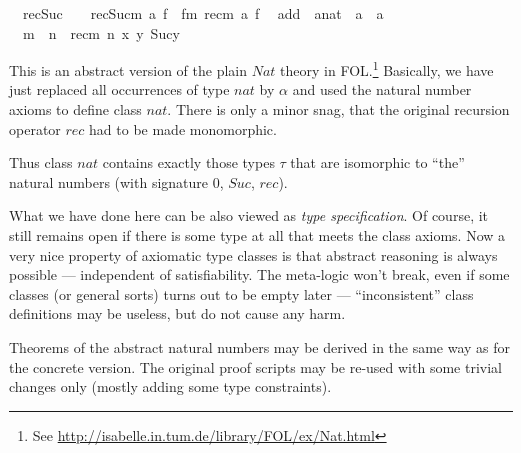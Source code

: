 \begin{isabelle}
\ \ rec{\isacharunderscore}Suc{\isacharcolon}\ \ \ \ {\isachardoublequote}rec{\isacharparenleft}Suc{\isacharparenleft}m{\isacharparenright}{\isacharcomma}\ a{\isacharcomma}\ f{\isacharparenright}\ {\isacharequal}\ f{\isacharparenleft}m{\isacharcomma}\ rec{\isacharparenleft}m{\isacharcomma}\ a{\isacharcomma}\ f{\isacharparenright}{\isacharparenright}{\isachardoublequote}\isanewline
\isanewline
{}\isanewline
\ \ add\ {\isacharcolon}{\isacharcolon}\ {\isachardoublequote}{\isacharprime}a{\isacharcolon}{\isacharcolon}nat\ {\isasymRightarrow}\ {\isacharprime}a\ {\isasymRightarrow}\ {\isacharprime}a{\isachardoublequote}\ \ \ \ {\isacharparenleft}\ {\isachardoublequote}{\isacharplus}{\isachardoublequote}\ \isanewline
\ \ {\isachardoublequote}m\ {\isacharplus}\ n\ {\isasymequiv}\ rec{\isacharparenleft}m{\isacharcomma}\ n{\isacharcomma}\ {\isasymlambda}x\ y{\isachardot}\ Suc{\isacharparenleft}y{\isacharparenright}{\isacharparenright}{\isachardoublequote}%
\begin{isamarkuptext}%
This is an abstract version of the plain $Nat$ theory in
 FOL.\footnote{See
 \url{http://isabelle.in.tum.de/library/FOL/ex/Nat.html}} Basically,
 we have just replaced all occurrences of type $nat$ by $\alpha$ and
 used the natural number axioms to define class $nat$.  There is only
 a minor snag, that the original recursion operator $rec$ had to be
 made monomorphic.

 Thus class $nat$ contains exactly those types $\tau$ that are
 isomorphic to ``the'' natural numbers (with signature $0$, $Suc$,
 $rec$).

 \medskip What we have done here can be also viewed as \emph{type
 specification}.  Of course, it still remains open if there is some
 type at all that meets the class axioms.  Now a very nice property of
 axiomatic type classes is that abstract reasoning is always possible
 --- independent of satisfiability.  The meta-logic won't break, even
 if some classes (or general sorts) turns out to be empty later ---
 ``inconsistent'' class definitions may be useless, but do not cause
 any harm.

 Theorems of the abstract natural numbers may be derived in the same
 way as for the concrete version.  The original proof scripts may be
 re-used with some trivial changes only (mostly adding some type
 constraints).%
\end{isamarkuptext}%
\end{isabelle}%
